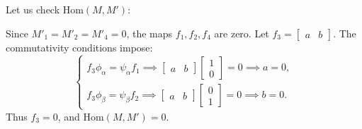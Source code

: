 \documentclass[11pt, a4paper]{report}
\begin{document}
\begin{example}
Let us check $ \mathrm{Hom}(M,M') $:
\begin{center}
\end{center}

Since $M'_1=M'_2=M'_4=0$, the maps $f_1, f_2, f_4$ are zero. Let $f_3 = \begin{bmatrix} a & b \end{bmatrix}$. The commutativity conditions impose:
\[
\begin{cases}
f_3 \phi_\alpha = \psi_\alpha f_1 \implies \begin{bmatrix} a & b \end{bmatrix} \begin{bmatrix} 1 \\ 0 \end{bmatrix} = 0 \implies a = 0, \\
f_3 \phi_\beta = \psi_\beta f_2 \implies \begin{bmatrix} a & b \end{bmatrix} \begin{bmatrix} 0 \\ 1 \end{bmatrix} = 0 \implies b = 0.
\end{cases}
\]
Thus $f_3 = 0$, and $\mathrm{Hom}(M, M') = 0$.


\end{example}
\end{document}
